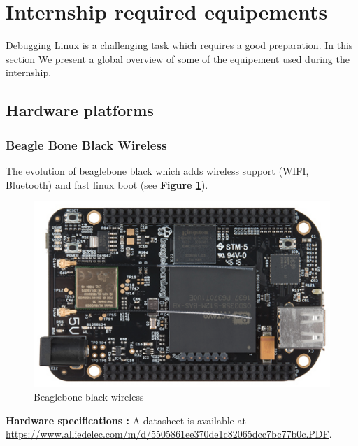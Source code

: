 \section{Internship required equipements}
Debugging Linux is a challenging task which requires a good preparation. In this section We present a global overview of some of the equipement used during the internship.
\subsection{Hardware platforms}


\subsubsection{Beagle Bone Black Wireless} 
The evolution of beaglebone black which adds wireless support (WIFI, Bluetooth) and fast linux boot (see \textbf{Figure \ref{Beaglebone black wireless}}). 
		\begin{figure}[H]
			\centering
        	\includegraphics[scale=0.25]{img/mean/beaglebone-black-wireless.png}
        	\caption{Beaglebone black wireless}
        	\label{Beaglebone black wireless}
    	\end{figure}
\begin{center}
\textbf{\color{red}Hardware specifications : } 
A datasheet is available at {\color{blue}\url{https://www.alliedelec.com/m/d/5505861ee370de1c82065dcc7bc77b0c.PDF}}.
\end{center}

